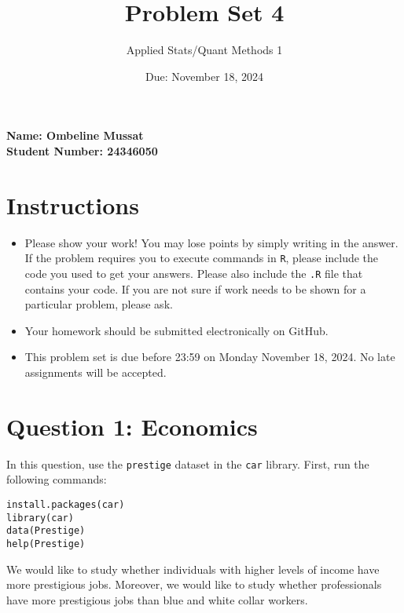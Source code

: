 \documentclass[12pt,letterpaper]{article}
\title{Problem Set 4}
\date{Due: November 18, 2024}
\author{Applied Stats/Quant Methods 1}
\begin{document}
	
	\maketitle
	\vspace{-2em} 
	\noindent \textbf{Name: Ombeline Mussat} \\
	\noindent \textbf{Student Number: 24346050} \\
	\vspace{1cm}
	
	\maketitle
	\section*{Instructions}
	\begin{itemize}
		\item Please show your work! You may lose points by simply writing in the answer. If the problem requires you to execute commands in \texttt{R}, please include the code you used to get your answers. Please also include the \texttt{.R} file that contains your code. If you are not sure if work needs to be shown for a particular problem, please ask.
		\item Your homework should be submitted electronically on GitHub.
		\item This problem set is due before 23:59 on Monday November 18, 2024. No late assignments will be accepted.
	\end{itemize}



	\vspace{.5cm}
\section*{Question 1: Economics}
\vspace{.25cm}
\noindent 	
In this question, use the \texttt{prestige} dataset in the \texttt{car} library. First, run the following commands:

\begin{verbatim}
install.packages(car)
library(car)
data(Prestige)
help(Prestige)
\end{verbatim} 


\noindent We would like to study whether individuals with higher levels of income have more prestigious jobs. Moreover, we would like to study whether professionals have more prestigious jobs than blue and white collar workers.
\end{document}
